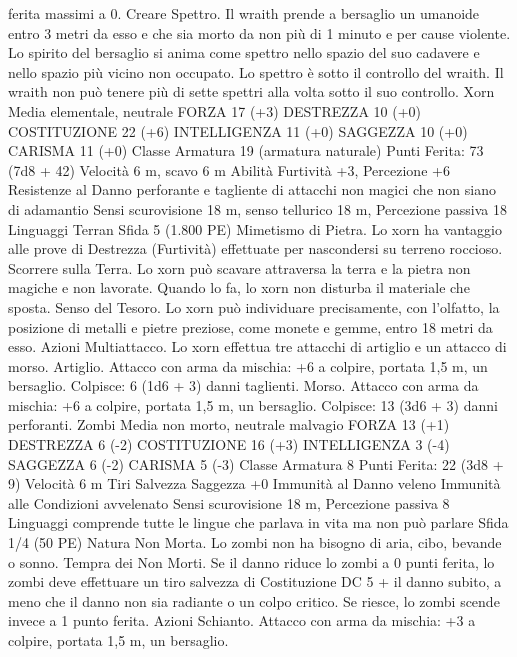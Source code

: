 \begin{multicols}{2}
ferita massimi a 0.
Creare Spettro. Il wraith prende a bersaglio un umanoide entro 3
metri da esso e che sia morto da non più di 1 minuto e per cause
violente. Lo spirito del bersaglio si anima come spettro nello
spazio del suo cadavere e nello spazio più vicino non occupato.
Lo spettro è sotto il controllo del wraith. Il wraith non può tenere
più di sette spettri alla volta sotto il suo controllo.
Xorn
Media elementale, neutrale
FORZA 17 (+3)
DESTREZZA 10 (+0)
COSTITUZIONE 22 (+6)
INTELLIGENZA 11 (+0)
SAGGEZZA 10 (+0)
CARISMA 11 (+0)
Classe Armatura 19 (armatura naturale)
\hspace*{0pt}\hfill{Punti Ferita}: 73 (7d8 + 42)
Velocità 6 m, scavo 6 m
Abilità Furtività +3, Percezione +6
Resistenze al Danno perforante e tagliente di attacchi non
magici che non siano di adamantio
Sensi scurovisione 18 m, senso tellurico 18 m, Percezione
passiva 18
Linguaggi Terran
Sfida 5 (1.800 PE)
Mimetismo di Pietra. Lo xorn ha vantaggio alle prove di
Destrezza (Furtività) effettuate per nascondersi su terreno
roccioso.
Scorrere sulla Terra. Lo xorn può scavare attraversa la terra e la
pietra non magiche e non lavorate. Quando lo fa, lo xorn non
disturba il materiale che sposta.
Senso del Tesoro. Lo xorn può individuare precisamente, con
l’olfatto, la posizione di metalli e pietre preziose, come monete e
gemme, entro 18 metri da esso.
Azioni
Multiattacco. Lo xorn effettua tre attacchi di artiglio e un attacco
di morso.
Artiglio. Attacco con arma da mischia: +6 a colpire, portata 1,5
m, un bersaglio.
Colpisce: 6 (1d6 + 3) danni taglienti.
Morso. Attacco con arma da mischia: +6 a colpire, portata 1,5
m, un bersaglio.
Colpisce: 13 (3d6 + 3) danni perforanti.
Zombi
Media non morto, neutrale malvagio
FORZA 13 (+1)
DESTREZZA 6 (-2)
COSTITUZIONE 16 (+3)
INTELLIGENZA 3 (-4)
SAGGEZZA 6 (-2)
CARISMA 5 (-3)
Classe Armatura 8
\hspace*{0pt}\hfill{Punti Ferita}: 22 (3d8 + 9)
Velocità 6 m
Tiri Salvezza Saggezza +0
Immunità al Danno veleno
Immunità alle Condizioni avvelenato
Sensi scurovisione 18 m, Percezione passiva 8
Linguaggi comprende tutte le lingue che parlava in vita ma non
può parlare
Sfida 1/4 (50 PE)
Natura Non Morta. Lo zombi non ha bisogno di aria, cibo,
bevande o sonno.
Tempra dei Non Morti. Se il danno riduce lo zombi a 0 punti
ferita, lo zombi deve effettuare un tiro salvezza di Costituzione
DC 5 + il danno subito, a meno che il danno non sia radiante o
un colpo critico. Se riesce, lo zombi scende invece a 1 punto
ferita.
Azioni
Schianto. Attacco con arma da mischia: +3 a colpire, portata 1,5
m, un bersaglio.

\end{multicols}
